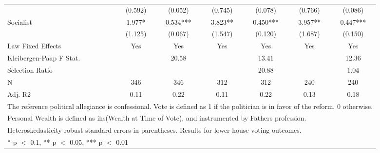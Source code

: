 \begin{table}
\begin{tabular}[t]{lcccccc}
 & (\num{0.592}) & (\num{0.052}) & (\num{0.745}) & (\num{0.078}) & (\num{0.766}) & (\num{0.086})\\
Socialist & \num{1.977}* & \num{0.534}*** & \num{3.823}** & \num{0.450}*** & \num{3.957}** & \num{0.447}***\\
 & (\num{1.125}) & (\num{0.067}) & (\num{1.547}) & (\num{0.120}) & (\num{1.687}) & (\num{0.150})\\
\midrule
Law Fixed Effects & Yes & Yes & Yes & Yes & Yes & Yes\\
Kleibergen-Paap F Stat. &  & 20.58 &  & 13.41 &  & 12.36\\
Selection Ratio &  &  &  & 20.88 &  & 1.04\\
N & \num{346} & \num{346} & \num{312} & \num{312} & \num{240} & \num{240}\\
Adj. R2 & \num{0.11} & \num{0.22} & \num{0.11} & \num{0.22} & \num{0.13} & \num{0.18}\\
\bottomrule
\multicolumn{7}{l}{\rule{0pt}{1em}The reference political allegiance is confessional. Vote is defined as 1 if the politician is in favor of the reform, 0 otherwise.}\\
\multicolumn{7}{l}{\rule{0pt}{1em}Personal Wealth is defined as ihs(Wealth at Time of Vote), and instrumented by Fathers profession.}\\
\multicolumn{7}{l}{\rule{0pt}{1em}Heteroskedasticity-robust standard errors in parentheses. Results for lower house voting outcomes.}\\
\multicolumn{7}{l}{\rule{0pt}{1em}* p $<$ 0.1, ** p $<$ 0.05, *** p $<$ 0.01}\\
\end{tabular}
\end{table}
